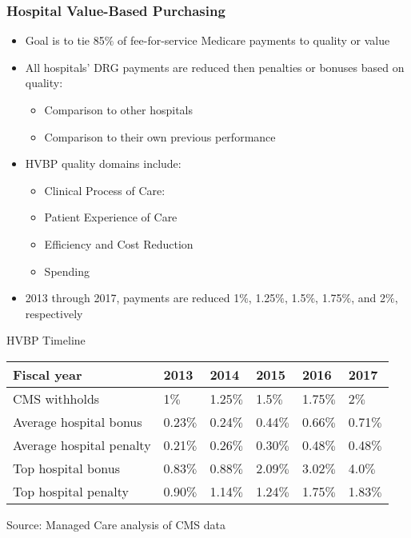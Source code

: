 \documentclass{beamer}
\begin{document}
\begin{frame}
\frametitle{Hospital Value-Based Purchasing}
\begin{itemize}
\item Goal is to tie 85$\%$ of fee-for-service Medicare payments to quality or value
\item All hospitals' DRG payments are reduced then penalties or bonuses based on quality: 
\begin{itemize}
\item Comparison to other hospitals
\item Comparison to their own previous performance
\end{itemize}
\item HVBP quality domains include:
\begin{itemize}
\item Clinical Process of Care: 
\item Patient Experience of Care
\item Efficiency and Cost Reduction
\item Spending
\end{itemize}
\item 2013 through 2017, payments are reduced 1$\%$, 1.25$\%$, 1.5$\%$, 1.75$\%$, and 2$\%$, respectively  
\end{itemize}
\end{frame}


\begin{frame}{HVBP Timeline}
\begin{table}
\centering
\begin{tabular}{llllll}
\hline \hline
Fiscal year   &	2013  &	2014  &	2015  &	2016	  &2017 \\
\hline
CMS withholds   &	1$\%$	  &1.25$\%$  &	1.5$\%$	  &1.75$\%$  &	2$\%$ \\
Average hospital bonus &	0.23$\%$	&	0.24$\%$	&	0.44$\%$	&	0.66$\%$	&	0.71$\%$ \\
Average hospital penalty &	0.21$\%$&		0.26$\%$	&	0.30$\%$&		0.48$\%$	&	0.48$\%$\\
Top hospital bonus &	0.83$\%$&		0.88$\%$	&	2.09$\%$&		3.02$\%$	&	4.0$\%$\\
Top hospital penalty &		0.90$\%$&		1.14$\%$	&	1.24$\%$&		1.75$\%$	&	1.83$\%$\\
\hline
\end{tabular}
\end{table}
\tiny Source: Managed Care analysis of CMS data
\end{frame}
\end{document}
